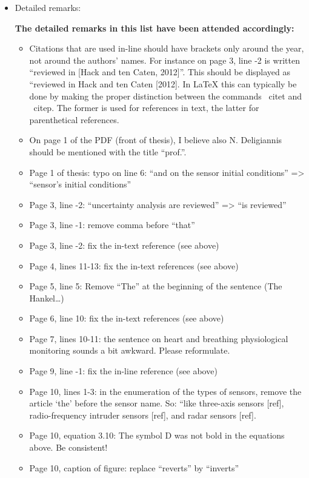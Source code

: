 \documentclass[11pt]{article}
\begin{document}
\begin{itemize}
\begin{itemize}
    \color{black}

    
    \end{itemize}
    \item Detailed remarks:
    
    {\bfseries The detailed remarks in this list have been attended accordingly: }
    
    \begin{itemize}
    \item Citations that are used in-line should have brackets only around the year, not around the authors’ names. For instance on page 3, line -2 is written “reviewed in [Hack and ten Caten, 2012]”. This should be displayed as “reviewed in Hack and ten Caten [2012]. In LaTeX this can typically be done by making the proper distinction between the commands \ citet and \ citep. The former is used for references in text, the latter for parenthetical references.
    \item  On page 1 of the PDF (front of thesis), I believe also N. Deligiannis should be mentioned with the title “prof.”. 
    \item Page 1 of thesis: typo on line 6: “and on the sensor initial conditions” => “sensor’s initial conditions”
    \item Page 3, line -2: “uncertainty analysis are reviewed” => “is reviewed”
    \item Page 3, line -1: remove comma before “that”
    \item Page 3, line -2: fix the in-text reference (see above)
    \item Page 4, lines 11-13: fix the in-text references (see above)
    \item Page 5, line 5: Remove “The” at the beginning of the sentence (The Hankel…)
    \item Page 6, line 10: fix the in-text references (see above)
    \item Page 7, lines 10-11: the sentence on heart and breathing physiological monitoring sounds a bit awkward. Please reformulate.
    \item Page 9, line -1: fix the in-line reference (see above)
    \item Page 10, lines 1-3: in the enumeration of the types of sensors, remove the article ‘the’ before the sensor name. So: “like three-axis sensors [ref], radio-frequency intruder sensors [ref], and radar sensors [ref]. 
    \item Page 10, equation 3.10: The symbol D was not bold in the equations above. Be consistent!
    \item Page 10, caption of figure: replace “reverts” by “inverts”

\end{itemize}
\end{itemize}
\end{document}
